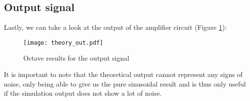 \subsection{Output signal}

\hspace{12pt} Lastly, we can take a look at the output of the amplifier circuit (Figure \ref{fig:output_th}):

\begin{figure}[h]
	\centering
	\texttt{[image: theory\_out.pdf]}
	\caption{Octave results for the output signal}
	\label{fig:output_th}
\end{figure}

It is important to note that the theoretical output cannot represent any signs of noise, only being able to give us the pure sinusoidal result and is thus only useful if the simulation output does not show a lot of noise.

